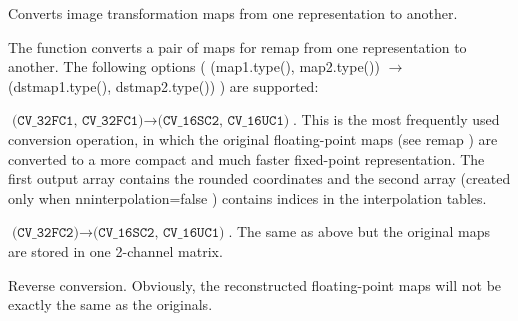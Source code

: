 Converts image transformation maps from one representation to another. 

The function converts a pair of maps for remap from one representation to another. The following options ( (map1.\+type(), map2.\+type()) $\rightarrow$ (dstmap1.\+type(), dstmap2.\+type()) ) are supported\+: 


\begin{DoxyItemize}
\item $\texttt{(CV_32FC1, CV_32FC1)} \rightarrow \texttt{(CV_16SC2, CV_16UC1)}$. This is the most frequently used conversion operation, in which the original floating-\/point maps (see remap ) are converted to a more compact and much faster fixed-\/point representation. The first output array contains the rounded coordinates and the second array (created only when nninterpolation=false ) contains indices in the interpolation tables. 
\end{DoxyItemize}


\begin{DoxyItemize}
\item $\texttt{(CV_32FC2)} \rightarrow \texttt{(CV_16SC2, CV_16UC1)}$. The same as above but the original maps are stored in one 2-\/channel matrix. 
\end{DoxyItemize}


\begin{DoxyItemize}
\item Reverse conversion. Obviously, the reconstructed floating-\/point maps will not be exactly the same as the originals. 
\end{DoxyItemize}


